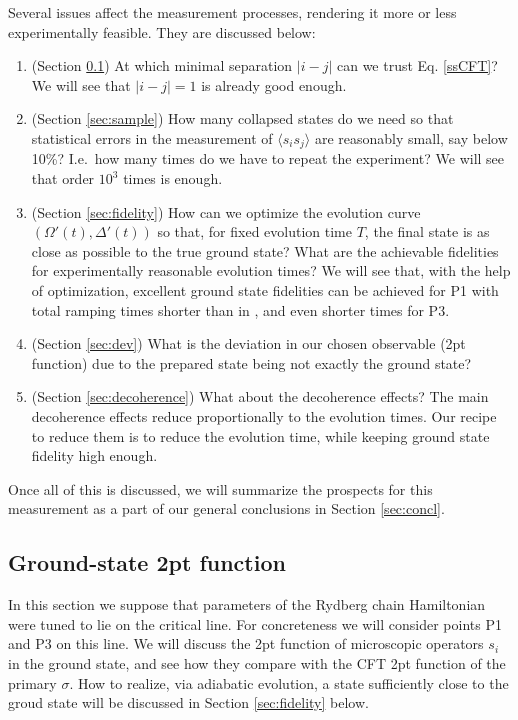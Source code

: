\documentclass[a4paper,12pt]{article}
\theoremstyle{remark}
\theoremstyle{theorem}
\begin{document}
Several issues affect the measurement processes, rendering it more or less
experimentally feasible. They are discussed below:
\begin{enumerate}
	\item (Section \ref{sec:2ptDMRG}) At which minimal separation $| i - j |$
	can we trust Eq. \eqref{ssCFT}? We will see that $| i - j | = 1$ is already
	good enough.
	
	\item (Section \ref{sec:sample}) How many collapsed states do we need so
	that statistical errors in the measurement of $\langle s_i s_j \rangle$ are
	reasonably small, say below 10\%? I.e.~how many times do we have to repeat the
	experiment? We will see that order $10^3$ times is enough.
	
	\item (Section \ref{sec:fidelity}) How can we optimize the evolution curve
	$(\Omega' (t), \Delta' (t))$ so that, for fixed evolution time $T$, the
	final state is as close as possible to the true ground state? What are the
	achievable fidelities for experimentally reasonable evolution times? We will
	see that, with the help of optimization, excellent ground state fidelities
	can be achieved for P1 with total ramping times shorter than in
	{\cite{Fang:2024uyf}}, and even shorter times for P3.
	
	\item (Section \ref{sec:dev}) What is the deviation in our chosen observable (2pt function) due to the prepared state being not exactly the ground state?
	
	\item (Section \ref{sec:decoherence}) What about the decoherence effects?
	The main decoherence effects reduce proportionally to the evolution times.
	Our recipe to reduce them is to reduce the evolution time, while keeping
	ground state fidelity high enough.
\end{enumerate}
Once all of this is discussed, we will summarize the prospects for this measurement as a part of our general conclusions
in Section \ref{sec:concl}.

\subsection{Ground-state 2pt function}\label{sec:2ptDMRG}

In this section we suppose that parameters of the Rydberg chain Hamiltonian
were tuned to lie on the critical line. For concreteness we will consider
points P1 and P3 on this line. We will discuss the 2pt function of microscopic
operators $s_i$ in the ground state, and see how they compare with the CFT 2pt
function of the primary $\sigma$. How to realize, via adiabatic evolution, a
state sufficiently close to the groud state will be discussed in Section
\ref{sec:fidelity} below.
\end{document}
